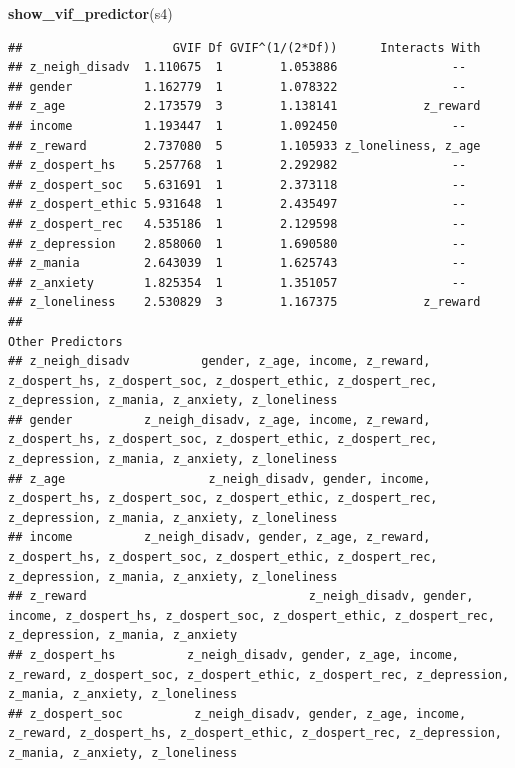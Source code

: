 \documentclass[
]{article}
\newenvironment{Shaded}{\begin{snugshade}}{\end{snugshade}}
\newcommand{\FunctionTok}[1]{\textcolor[rgb]{0.13,0.29,0.53}{\textbf{#1}}}
\newcommand{\NormalTok}[1]{#1}
\begin{document}
\begin{Shaded}
\begin{Highlighting}[]
\FunctionTok{show\_vif\_predictor}\NormalTok{(s4)}
\end{Highlighting}
\end{Shaded}

\begin{verbatim}
##                     GVIF Df GVIF^(1/(2*Df))      Interacts With
## z_neigh_disadv  1.110675  1        1.053886                --  
## gender          1.162779  1        1.078322                --  
## z_age           2.173579  3        1.138141            z_reward
## income          1.193447  1        1.092450                --  
## z_reward        2.737080  5        1.105933 z_loneliness, z_age
## z_dospert_hs    5.257768  1        2.292982                --  
## z_dospert_soc   5.631691  1        2.373118                --  
## z_dospert_ethic 5.931648  1        2.435497                --  
## z_dospert_rec   4.535186  1        2.129598                --  
## z_depression    2.858060  1        1.690580                --  
## z_mania         2.643039  1        1.625743                --  
## z_anxiety       1.825354  1        1.351057                --  
## z_loneliness    2.530829  3        1.167375            z_reward
##                                                                                                                                                     Other Predictors
## z_neigh_disadv          gender, z_age, income, z_reward, z_dospert_hs, z_dospert_soc, z_dospert_ethic, z_dospert_rec, z_depression, z_mania, z_anxiety, z_loneliness
## gender          z_neigh_disadv, z_age, income, z_reward, z_dospert_hs, z_dospert_soc, z_dospert_ethic, z_dospert_rec, z_depression, z_mania, z_anxiety, z_loneliness
## z_age                    z_neigh_disadv, gender, income, z_dospert_hs, z_dospert_soc, z_dospert_ethic, z_dospert_rec, z_depression, z_mania, z_anxiety, z_loneliness
## income          z_neigh_disadv, gender, z_age, z_reward, z_dospert_hs, z_dospert_soc, z_dospert_ethic, z_dospert_rec, z_depression, z_mania, z_anxiety, z_loneliness
## z_reward                               z_neigh_disadv, gender, income, z_dospert_hs, z_dospert_soc, z_dospert_ethic, z_dospert_rec, z_depression, z_mania, z_anxiety
## z_dospert_hs          z_neigh_disadv, gender, z_age, income, z_reward, z_dospert_soc, z_dospert_ethic, z_dospert_rec, z_depression, z_mania, z_anxiety, z_loneliness
## z_dospert_soc          z_neigh_disadv, gender, z_age, income, z_reward, z_dospert_hs, z_dospert_ethic, z_dospert_rec, z_depression, z_mania, z_anxiety, z_loneliness

\end{verbatim}
\end{document}
